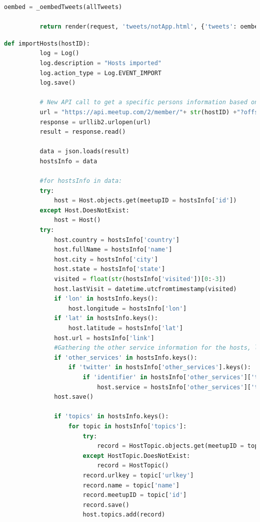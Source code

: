 \documentclass[draftclsnofoot,10pt,onecolumn]{IEEEtran} %
\begin{document}
\begin{center}
\begin{lstlisting}[caption=Views.py showing the Twitter authorization and
        search for tweets from the application., language=Python]
          oembed = _oembedTweets(allTweets)

          return render(request, 'tweets/notApp.html', {'tweets': oembed})
  \end{lstlisting}
\end{center}

\begin{center}
  \captionsetup{width=.5\linewidth}
  \begin{lstlisting}[caption=Views.py showing the importing of hosts of the 
                      events, language=Python]
      def importHosts(hostID):
          log = Log()
          log.description = "Hosts imported"
          log.action_type = Log.EVENT_IMPORT
          log.save()

          # New API call to get a specific persons information based on the Host ID
          url = "https://api.meetup.com/2/member/"+ str(hostID) +"?offset=0&format=json&photo-host=public&page=500&sig_id=148657742&key=" + MEETUP_API_KEY
          response = urllib2.urlopen(url)
          result = response.read()

          data = json.loads(result)
          hostsInfo = data

          #for hostsInfo in data:
          try:
              host = Host.objects.get(meetupID = hostsInfo['id'])
          except Host.DoesNotExist:
              host = Host()
          try:
              host.country = hostsInfo['country']
              host.fullName = hostsInfo['name']
              host.city = hostsInfo['city']
              host.state = hostsInfo['state']
              visited = float(str(hostsInfo['visited'])[0:-3])
              host.lastVisit = datetime.utcfromtimestamp(visited)
              if 'lon' in hostsInfo.keys():
                  host.longitude = hostsInfo['lon']
              if 'lat' in hostsInfo.keys():
                  host.latitude = hostsInfo['lat']
              host.url = hostsInfo['link']
              #Gathering the other service information for the hosts, looking for Twitter
              if 'other_services' in hostsInfo.keys():
                  if 'twitter' in hostsInfo['other_services'].keys():
                      if 'identifier' in hostsInfo['other_services']['twitter'].keys():
                          host.service = hostsInfo['other_services']['twitter']['identifier']
              host.save()

              if 'topics' in hostsInfo.keys():
                  for topic in hostsInfo['topics']:
                      try:
                          record = HostTopic.objects.get(meetupID = topic['id'])
                      except HostTopic.DoesNotExist:
                          record = HostTopic()
                      record.urlkey = topic['urlkey']
                      record.name = topic['name']
                      record.meetupID = topic['id']
                      record.save()
                      host.topics.add(record)



\end{lstlisting}
\end{center}
\end{document}
